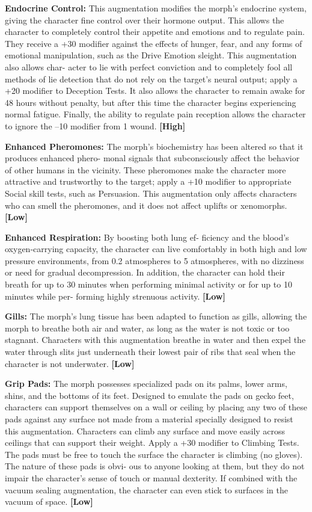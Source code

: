 \textbf{Endocrine Control:} This augmentation modifies the 
morph's endocrine system, giving the character fine 
control over their hormone output. This allows the 
character to completely control their appetite and 
emotions and to regulate pain. They receive a +30 
modifier against the effects of hunger, fear, and any 
forms of emotional manipulation, such as the Drive 
Emotion sleight. This augmentation also allows char-
acter to lie with perfect conviction and to completely 
fool all methods of lie detection that do not rely 
on the target's neural output; apply a +20 modifier 
to Deception Tests. It also allows the character to 
remain awake for 48 hours without penalty, but after 
this time the character begins experiencing normal 
fatigue. Finally, the ability to regulate pain reception 
allows the character to ignore the –10 modifier from 
1 wound. \textbf{[High]}

\textbf{Enhanced Pheromones:} The morph's biochemistry 
has been altered so that it produces enhanced phero-
monal signals that subconsciously affect the behavior 
of other humans in the vicinity. These pheromones 
make the character more attractive and trustworthy to 
the target; apply a +10 modifier to appropriate Social 
skill tests, such as Persuasion. This augmentation only 
affects characters who can smell the pheromones, and 
it does not affect uplifts or xenomorphs. \textbf{[Low]}

\textbf{Enhanced Respiration:} By boosting both lung ef-
ficiency and the blood's oxygen-carrying capacity, the 
character can live comfortably in both high and low 
pressure environments, from 0.2 atmospheres to 5 
atmospheres, with no dizziness or need for gradual 
decompression. In addition, the character can hold 
their breath for up to 30 minutes when performing 
minimal activity or for up to 10 minutes while per-
forming highly strenuous activity. \textbf{[Low]}

\textbf{Gills: }The morph's lung tissue has been adapted to 
function as gills, allowing the morph to breathe both 
air and water, as long as the water is not toxic or too 
stagnant. Characters with this augmentation breathe 
in water and then expel the water through slits just 
underneath their lowest pair of ribs that seal when the 
character is not underwater. \textbf{[Low]}

\textbf{Grip Pads: }The morph possesses specialized pads 
on its palms, lower arms, shins, and the bottoms of 
its feet. Designed to emulate the pads on gecko feet, 
characters can support themselves on a wall or ceiling 
by placing any two of these pads against any surface 
not made from a material specially designed to resist 
this augmentation. Characters can climb any surface 
and move easily across ceilings that can support their 
weight. Apply a +30 modifier to Climbing Tests. The 
pads must be free to touch the surface the character is 
climbing (no gloves). The nature of these pads is obvi-
ous to anyone looking at them, but they do not impair 
the character's sense of touch or manual dexterity. If 
combined with the vacuum sealing augmentation, the 
character can even stick to surfaces in the vacuum of 
space. \textbf{[Low]}

